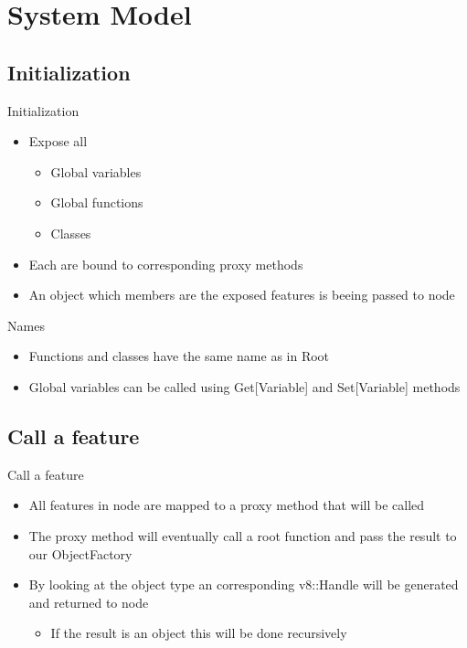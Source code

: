 \section{System Model}
\subsection{Initialization}
\begin{frame}{Initialization}
  \begin{itemize}
    \item Expose all
    \begin{itemize}
      \item Global variables
      \item Global functions
      \item Classes
    \end{itemize}
    \pause
    \item Each are bound to corresponding proxy methods
    \item An object which members are the exposed features is beeing passed to node
  \end{itemize}
  \pause
  \begin{block}{Names}
    \begin{itemize}
      \item Functions and classes have the same name as in Root
      \item Global variables can be called using Get[Variable] and Set[Variable] methods
    \end{itemize}
  \end{block}
\end{frame}

\subsection{Call a feature}
\begin{frame}{Call a feature}
  \begin{itemize}
    \item All features in node are mapped to a proxy method that will be called
    \pause
    \item The proxy method will eventually call a root function and pass the result to our ObjectFactory
    \pause
    \item By looking at the object type an corresponding v8::Handle will be generated and returned to node
    \begin{itemize}
      \item If the result is an object this will be done recursively
    \end{itemize}
  \end{itemize}
\end{frame}

